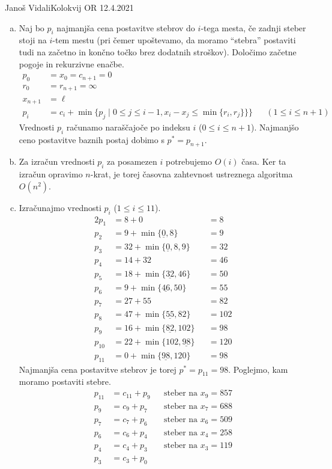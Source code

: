 \begin{naloga}{Janoš Vidali}{Kolokvij OR 12.4.2021}
\begin{odgovor}
\begin{enumerate}[(a)]
\item Naj bo $p_i$ najmanjša cena postavitve stebrov do $i$-tega mesta,
če zadnji steber stoji na $i$-tem mestu
(pri čemer upoštevamo,
da moramo ``stebra'' postaviti tudi na začetno in končno točko
brez dodatnih stroškov).
Določimo začetne pogoje in rekurzivne enačbe.
\begin{align*}
p_0 &= x_0 = c_{n+1} = 0 \\
r_0 &= r_{n+1} = \infty \\
x_{n+1} &= \ell \\
p_i &= c_i + \min\{p_j \mid 0 \le j \le i-1, x_i - x_j \le \min\{r_i, r_j\}\}\} && (1 \le i \le n+1)
\end{align*}
Vrednosti $p_i$ računamo naraščajoče po indeksu $i$ ($0 \le i \le n+1$).
Najmanjšo ceno postavitve baznih postaj dobimo s $p^* = p_{n+1}$.

\item Za izračun vrednosti $p_i$ za posamezen $i$
potrebujemo $O(i)$ časa.
Ker ta izračun opravimo $n$-krat,
je torej časovna zahtevnost ustreznega algoritma $O(n^2)$.

\item Izračunajmo vrednosti $p_i$ ($1 \le i \le 11$).
\begin{alignat*}{2}
p_1    &=  8 + 0                           &&= 8  \\
p_2    &=  9 + \min\{\underline{0}, 8\}    &&= 9  \\
p_3    &= 32 + \min\{\underline{0}, 8, 9\} &&= 32  \\
p_4    &= 14 + 32                          &&= 46 \\
p_5    &= 18 + \min\{\underline{32}, 46\}  &&= 50 \\
p_6    &=  9 + \min\{\underline{46}, 50\}  &&= 55 \\
p_7    &= 27 + 55                          &&= 82 \\
p_8    &= 47 + \min\{\underline{55}, 82\}  &&= 102 \\
p_9    &= 16 + \min\{\underline{82}, 102\} &&= 98 \\
p_{10} &= 22 + \min\{102, \underline{98}\} &&= 120 \\
p_{11} &=  0 + \min\{\underline{98}, 120\} &&= 98
\end{alignat*}
Najmanjša cena postavitve stebrov je torej $p^* = p_{11} = 98$.
Poglejmo, kam moramo postaviti stebre.
\begin{align*}
p_{11} &= c_{11} + p_9 && \text{steber na $x_9 = 857$} \\
p_9    &= c_9    + p_7 && \text{steber na $x_7 = 688$} \\
p_7    &= c_7    + p_6 && \text{steber na $x_6 = 509$} \\
p_6    &= c_6    + p_4 && \text{steber na $x_4 = 258$} \\
p_4    &= c_4    + p_3 && \text{steber na $x_3 = 119$} \\
p_3    &= c_3    + p_0
\end{align*}
\end{enumerate}
\end{odgovor}
\end{naloga}
